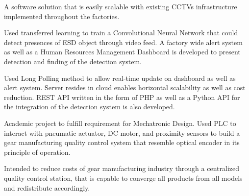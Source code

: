 \documentclass[letterpaper]{deedy-resume} %
\begin{document}

\newpage %

\begin{minipage}[t]{0.33\textwidth} %
\end{minipage}
\hfill
\begin{minipage}[t]{0.66\textwidth} %

\vspace{\topsep}
\begin{tightitemize}
\item A software solution that is easily scalable with existing CCTVs infrastructure implemented throughout the factories.
\item Used transferred learning to train a Convolutional Neural Network that could detect presences of ESD object through video feed. 
A factory wide alert system as well as a Human Resources Management Dashboard is developed to present detection and finding of the detection system.
\item Used Long Polling method to allow real-time update on dashboard as well as alert system. 
Server resides in cloud enables horizontal scalability as well as cost reduction. 
REST API written in the form of PHP as well as a Python API for the integration of the detection system is also developed.
\end{tightitemize} 
\sectionspace %

\vspace{\topsep}
\begin{tightitemize}
\item Academic project to fulfill requirement for Mechatronic Design. 
Used PLC to interact with pneumatic actuator, DC motor, and proximity sensors to build a gear manufacturing quality control system that resemble optical encoder in its principle of operation.
\item Intended to reduce costs of gear manufacturing industry through a centralized quality control station, that is capable to converge all products from all models and redistribute accordingly.
\end{tightitemize} 
\sectionspace %


\end{minipage}
\end{document}
